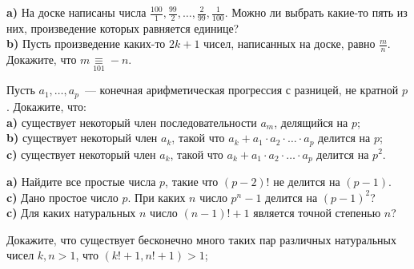 \begin{problems}
\item \textbf{a)} На доске написаны числа $\frac{100}{1}, \frac{99}{2}, \ldots, \frac{2}{99}, \frac{1}{100}$. Можно ли выбрать какие-то пять из них, произведение которых равняется единице? \\
\textbf{b)} Пусть произведение каких-то $2k+1$ чисел, написанных на доске, равно $\frac{m}{n}$. Докажите, что $m \mathop{\equiv}\limits_{101} -n$.  

\item Пусть $a_1, \ldots, a_p$~--- конечная арифметическая прогрессия с разницей, не кратной $p$. Докажите, что: \\
\textbf{a)} существует некоторый член последовательности $a_m$, делящийся на $p$;\\
\textbf{b)} существует некоторый член $a_k$, такой что $a_k+a_1\cdot a_2\cdot\ldots\cdot a_p$ делится на $p$;\\
\textbf{c)} существует некоторый член $a_k$, такой что $a_k+a_1\cdot a_2\cdot\ldots\cdot a_p$ делится на $p^2$.

\item 
\textbf{a)} Найдите все простые числа $p$, такие что $(p-2)!$ не делится на $(p-1)$.\\
\textbf{c)} Дано простое число $p$. При каких $n$ число $p^n-1$ делится на $(p-1)^2$?\\
\textbf{c)} Для каких натуральных $n$ число $(n-1)!+1$ является точной степенью $n$?


\item Докажите, что существует бесконечно много таких пар различных натуральных чисел 
$k,n>1$, что $(k!+1,n!+1)>1$; 


\end{problems}
